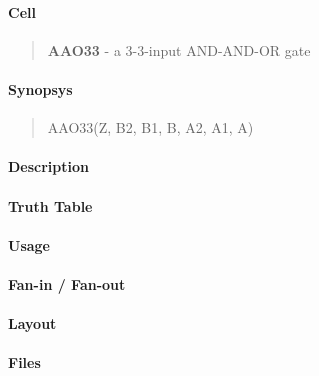 \label{AAO33}
\paragraph{Cell}
\begin{quote}
    \textbf{AAO33} - a 3-3-input AND-AND-OR gate
\end{quote}

\paragraph{Synopsys}
\begin{quote}
    AAO33(Z, B2, B1, B, A2, A1, A)
\end{quote}

\paragraph{Description}

%

\paragraph{Truth Table}
%

\paragraph{Usage}

\paragraph{Fan-in / Fan-out}

\paragraph{Layout}

\paragraph{Files}
